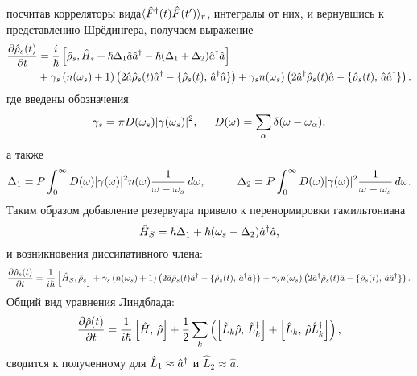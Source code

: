 посчитав корреляторы вида$\langle \hat{F}^{\dag}(t) \hat{F}(t')\rangle_r$, интегралы от них, и вернувшись к представлению Шрёдингера, получаем выражение
\begin{align*}
	\frac{\partial \hat{\rho}_s(t)}{\partial t} &= \frac{i}{\hbar}\left[
		\hat{\rho}_s, \hat{H}_s + \hbar \Delta_1 \hat{a} \hat{a}^{\dag} - \hbar (\Delta_1 + \Delta_2) \hat{a}^{\dag} \hat{a}
	\right] 
	\\&+ 
	\gamma_s\left(
		n(\omega_s) + 1
	\right)\left(
		2 \hat{a} \hat{\rho}_s(t) \hat{a}^{\dag} - \{\hat{\rho}_s(t),\, \hat{a}^{\dag} \hat{a}\}
	\right) + \gamma_s n(\omega_s) \left(
		2 \hat{a}^{\dag} \hat{\rho}_s (t) \hat{a} - \{\hat{\rho}_s(t),\, \hat{a} \hat{a}^{\dag}\}
	\right).
\end{align*}
где введены обозначения
\begin{equation*}
	\gamma_s = \pi D(\omega_s) |\gamma(\omega_s)|^2,
	\hspace{5 mm} 
	D(\omega) = \sum_\alpha \delta(\omega-\omega_\alpha),
\end{equation*}
а также
\begin{equation*}
	\Delta_1 = P \int_{0}^{\infty} D(\omega) |\gamma(\omega)|^2 n(\omega) \frac{1}{\omega-\omega_s} \d \omega,
	\hspace{10 mm} 
	\Delta_2 = P \int_{0}^{\infty} D(\omega) |\gamma(\omega)|^2 \frac{1}{\omega-\omega_s} \d \omega.
\end{equation*}
Таким образом добавление резервуара привело к перенормировки гамильтониана
\begin{equation*}
	\hat{H}_S = \hbar \Delta_1 + \hbar (\omega_s - \Delta_2) \hat{a}^{\dag} \hat{a},
\end{equation*}
и возникновения диссипативного члена:
\begin{equation*}
	\frac{\partial \hat{\rho}_s(t)}{\partial t} = \frac{1}{i\hbar}\left[\hat{H}_S, \hat{\rho}_s\right] + \gamma_s\left(
		n(\omega_s) + 1
	\right)\left(
		2 \hat{a} \hat{\rho}_s(t) \hat{a}^{\dag} - \{\hat{\rho}_s(t),\, \hat{a}^{\dag} \hat{a}\}
	\right) + \gamma_s n(\omega_s) \left(
		2 \hat{a}^{\dag} \hat{\rho}_s (t) \hat{a} - \{\hat{\rho}_s(t),\, \hat{a} \hat{a}^{\dag}\}
	\right).
\end{equation*}
Общий вид уравнения Линдблада:
\begin{equation*}
	\frac{\partial \hat{\rho}(t)}{\partial t} = \frac{1}{i\hbar} \left[\hat{H},\, \hat{\rho}\right] + \frac{1}{2} \sum_k \left(
		\left[\hat{L}_k \hat{\rho},\, \hat{L}^{\dag}_k\right] + 
		\left[\hat{L}_k,\, \hat{\rho} \hat{L}_k^{\dag}\right]
	\right),
\end{equation*}
сводится к полученному для $\hat{L}_1 \approx \hat{a}^{\dag}$ и $\hat{L}_2 \approx \hat{a}$.